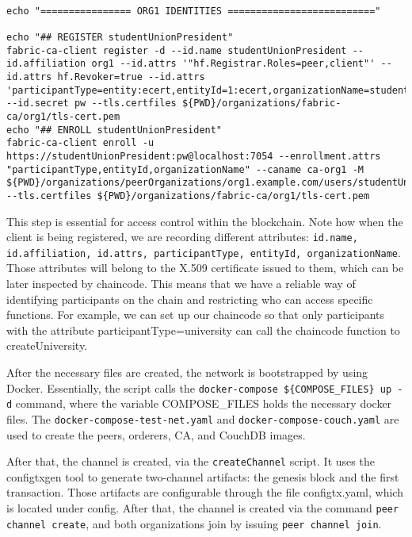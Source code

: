 \documentclass[12pt,a4paper]{article}
\theoremstyle{definition}
\begin{document}
\begin{verbatim}

echo "================ ORG1 IDENTITIES =========================="

echo "## REGISTER studentUnionPresident"
fabric-ca-client register -d --id.name studentUnionPresident --id.affiliation org1 --id.attrs '"hf.Registrar.Roles=peer,client"' --id.attrs hf.Revoker=true --id.attrs 'participantType=entity:ecert,entityId=1:ecert,organizationName=studentUnionTecnicoLisboa' --id.secret pw --tls.certfiles ${PWD}/organizations/fabric-ca/org1/tls-cert.pem
echo "## ENROLL studentUnionPresident"
fabric-ca-client enroll -u https://studentUnionPresident:pw@localhost:7054 --enrollment.attrs "participantType,entityId,organizationName" --caname ca-org1 -M ${PWD}/organizations/peerOrganizations/org1.example.com/users/studentUnionPresident@org1.example.com/msp --tls.certfiles ${PWD}/organizations/fabric-ca/org1/tls-cert.pem
\end{verbatim}

This step is essential for access control within the blockchain. Note how when the client is being registered, we are recording different attributes: \texttt{id.name, id.affiliation, id.attrs, participantType, entityId, organizationName}. Those attributes will belong to the X.509 certificate issued to them, which can be later inspected by chaincode. This means that we have a reliable way of identifying participants on the chain and restricting who can access specific functions. For example, we can set up our chaincode so that only participants with the attribute participantType=university can call the chaincode function to createUniversity.

After the necessary files are created, the network is bootstrapped by using Docker. Essentially, the script calls the \texttt{docker-compose \$\{COMPOSE\_FILES\} up -d} command, where the variable COMPOSE\_FILES holds the necessary docker files. The \texttt{docker-compose-test-net.yaml} and \texttt{docker-compose-couch.yaml} are used to create the peers, orderers, CA, and CouchDB images.

After that, the channel is created, via the \texttt{createChannel} script. It uses the configtxgen tool to generate two-channel artifacts: the genesis block and the first transaction. Those artifacts are configurable through the file configtx.yaml, which is located under config. After that, the channel is created via the command \texttt{peer channel create}, and both organizations join by issuing \texttt{peer channel join}.
\end{document}
